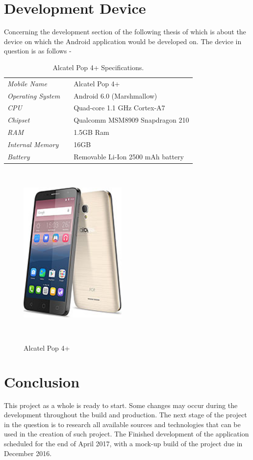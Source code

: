 \newpage

\section{Development Device}
Concerning the development section of the following thesis of which is about the device on which the Android application would be developed on. The device in question is as follows -

\begin{table}[!ht]
	\begin{tabular}{ l l l }
		\textit{Mobile Name} && Alcatel Pop 4+ \\
		\textit{Operating System} && Android 6.0 (Marshmallow)\\
		\textit{CPU} && Quad-core 1.1 GHz Cortex-A7 \\
		\textit{Chipset} && Qualcomm MSM8909 Snapdragon 210 \\
		\textit{RAM} && 1.5GB Ram \\
		\textit{Internal Memory} && 16GB \\
		\textit{Battery} && Removable Li-Ion 2500 mAh battery \\
	\end{tabular}
\caption{Alcatel Pop 4+ Specifications.}
\label{table : Alcatel Pop 4+ Specifications.}
\end{table}

\begin{figure}[!ht]
	\center \includegraphics[width=150pt, height=250pt]{alcatel}\\
	\caption{Alcatel Pop 4+} \label{Figure: Alcatel Pop 4+}
\end{figure}

\newpage
\section{Conclusion}
This project as a whole is ready to start. Some changes may occur during the development throughout the build and production. The next stage of the project in the question is to research all available sources and technologies that can be used in the creation of such project. The Finished development of the application scheduled for the end of April 2017, with a mock-up build of the project due in December 2016.
